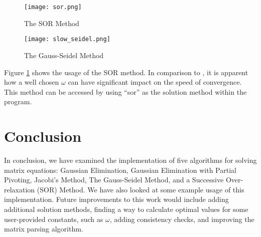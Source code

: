 \documentclass[12pt]{article}
\begin{document}
\begin{figure}[H]
\texttt{[image: sor.png]}
\caption{The SOR Method}
\label{sor}
\end{figure}

\begin{figure}[H]
\texttt{[image: slow\_seidel.png]}
\caption{The Gauss-Seidel Method}
\label{slow_seidel}
\end{figure}

Figure \ref{sor} shows the usage of the SOR method. In comparison to ,
it is apparent how a well chosen $\omega$ can have significant impact on the 
speed of convergence. This method can be accessed by using ``sor''
as the solution method within the program.



\section{Conclusion}
In conclusion, we have examined the implementation of 
 five algorithms for solving matrix equations: Gaussian Elimination, Gaussian Elimination with
Partial Pivoting, Jacobi's Method, The Gauss-Seidel Method, and a 
Successive Over-relaxation (SOR) Method. We have also looked at some example 
usage of this implementation. Future improvements to this work would include
adding additional solution methods, finding a way to calculate optimal values 
for some user-provided constants, such as $\omega$, adding consistency checks, 
and improving the matrix parsing algorithm.

\newpage
\end{document}

